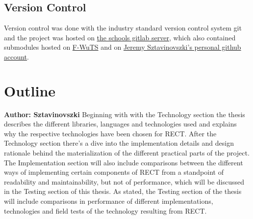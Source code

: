 \subsection{Version Control}
Version control was done with the industry standard version control system git and the project was hosted on \href{https://gitlab.htlwrn.ac.at/Sztavinovszki.Jeremy/RECT}{the schools gitlab server}, 
which also contained submodules hosted on \href{https://github.com/F-WuTS/}{F-WuTS} and on \href{https://github.com/if-loop69420}{Jeremy Sztavinovszki's personal github account}.

\section{Outline}
\textbf{Author: Sztavinovszki}
Beginning with with the Technology section the thesis describes the different libraries, languages and technologies used and explains why the respective technologies have been chosen for RECT.
After the Technology section there's a dive into the implementation details and design rationale behind the materialization of the different practical parts of the project.
The Implementation section will also include comparisons between the different ways of implementing certain components of RECT from a standpoint of readability and maintainability, but not of performance,
which will be discussed in the Testing section of this thesis. As stated, the Testing section of the thesis will include comparisons in performance of different implementations,
technologies and field tests of the technology resulting from RECT.





